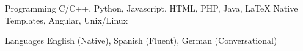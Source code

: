 


\begin{cvskills}


\cvskill
{Programming} %
{C/C++, Python, Javascript, HTML, PHP, Java, LaTeX {\enskip\cdotp\enskip} Native Templates, Angular, Unix/Linux}%



\cvskill
{Languages} %
{English (Native), Spanish (Fluent), German (Conversational)} %


\end{cvskills}